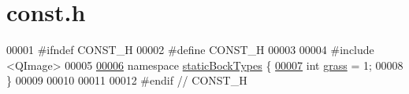 \hypertarget{a00086_source}{}\section{const.\+h}
\label{a00086_source}

\begin{DoxyCode}
00001 \textcolor{preprocessor}{#}\textcolor{preprocessor}{ifndef} \textcolor{preprocessor}{CONST\_H}
00002 \textcolor{preprocessor}{#}\textcolor{preprocessor}{define} \textcolor{preprocessor}{CONST\_H}
00003 
00004 \textcolor{preprocessor}{#}\textcolor{preprocessor}{include} \textcolor{preprocessor}{<}\textcolor{preprocessor}{QImage}\textcolor{preprocessor}{>}
00005 
\hyperlink{a00116}{00006} \textcolor{keyword}{namespace} \hyperlink{a00116}{staticBockTypes} \{
\hyperlink{a00116_a6dfdff0673d9c105ab375a71621be666}{00007} \textcolor{keywordtype}{int} \hyperlink{a00116_a6dfdff0673d9c105ab375a71621be666}{grass} = 1;
00008 \}
00009 
00010 
00011 
00012 \textcolor{preprocessor}{#}\textcolor{preprocessor}{endif} \textcolor{comment}{// CONST\_H}
\end{DoxyCode}
